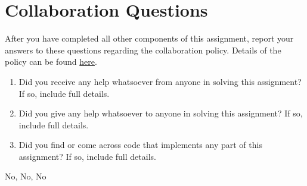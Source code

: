\documentclass[11pt,addpoints,answers]{exam}
\begin{document}
\begin{questions}
\begin{parts}
\begin{subparts}
\end{subparts}

\end{parts}
\end{questions} 

\newpage
\newpage
\section{Collaboration Questions}
After you have completed all other components of this assignment, report your answers to these questions regarding the collaboration policy. Details of the policy can be found \href{http://www.cs.cmu.edu/~mgormley/courses/10601/syllabus.html}{here}.
\begin{enumerate}
    \item Did you receive any help whatsoever from anyone in solving this assignment? If so, include full details.
    \item Did you give any help whatsoever to anyone in solving this assignment? If so, include full details.
    \item Did you find or come across code that implements any part of this assignment? If so, include full details.
\end{enumerate}

\begin{your_solution}[height=6cm]
No, No, No

\end{your_solution}
\end{document}
